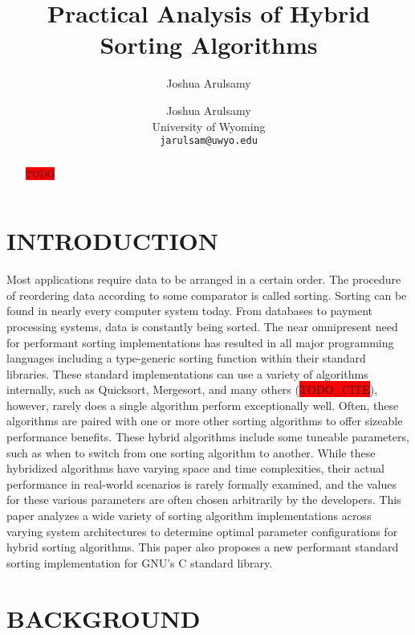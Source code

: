 \documentclass[letter, 12pt, conference]{ieeeconf}
\title{\LARGE \bf Practical Analysis of Hybrid Sorting Algorithms}
\author{Joshua Arulsamy}
\author{\parbox{3 in}{
\centering
Joshua Arulsamy\\
University of Wyoming\\
{\tt\small jarulsam@uwyo.edu}}}
\newcommand{\todo}{\colorbox{red}{TODO}}
\newcommand{\todocite}{\colorbox{red}{TODO\_CITE}}
\begin{document}
\maketitle
\thispagestyle{plain}
\pagestyle{plain}
\nocite{*}

\begin{abstract}

	\todo

\end{abstract}

\section{INTRODUCTION}

Most applications require data to be arranged in a certain order. The procedure
of reordering data according to some comparator is called sorting. Sorting can
be found in nearly every computer system today. From databases to payment
processing systems, data is constantly being sorted. The near omnipresent need
for performant sorting implementations has resulted in all major programming
languages including a type-generic sorting function within their standard
libraries. These standard implementations can use a variety of algorithms
internally, such as Quicksort, Mergesort, and many others (\todocite), however,
rarely does a single algorithm perform exceptionally well. Often, these
algorithms are paired with one or more other sorting algorithms to offer
sizeable performance benefits. These hybrid algorithms include some tuneable
parameters, such as when to switch from one sorting algorithm to another. While
these hybridized algorithms have varying space and time complexities, their
actual performance in real-world scenarios is rarely formally examined, and the
values for these various parameters are often chosen arbitrarily by the
developers. This paper analyzes a wide variety of sorting algorithm
implementations across varying system architectures to determine optimal
parameter configurations for hybrid sorting algorithms. This paper also proposes
a new performant standard sorting implementation for GNU's C standard library.

\section{BACKGROUND}
\end{document}
